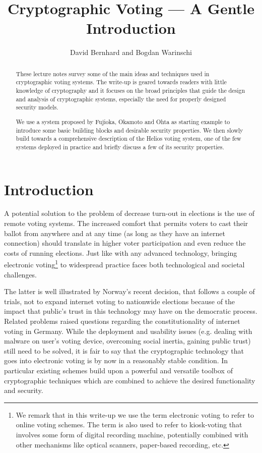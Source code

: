 \documentclass[envcountsame]{llncs}
\title{Cryptographic Voting --- A Gentle Introduction}
\author{David Bernhard and Bogdan Warinschi}
\institute{University of Bristol, England}
\begin{document}
\maketitle

\begin{abstract}
These lecture notes survey some of the main ideas and techniques used in cryptographic voting systems. 
The write-up is geared towards readers with little knowledge of cryptography and it focuses on the broad principles that guide the design and analysis of cryptographic systems, especially the need for properly designed security models.

We use a system proposed by Fujioka, Okamoto and Ohta as starting example to introduce some basic building blocks and desirable security properties.  We then slowly build towards a comprehensive description of the Helios voting system, one of the few systems deployed in practice and briefly discuss a few of its security properties. 
\end{abstract}

\section{Introduction}
A potential solution to the problem of decrease turn-out in elections is the use of remote voting systems.  The increased comfort that permits voters to cast their ballot from anywhere and at any time (as long as they have an internet connection) should translate in higher voter participation and even reduce the costs of running elections.  
Just like with any advanced technology, bringing electronic voting\footnote{We remark that in this write-up we use the term electronic voting to refer to online voting schemes. The term is also used to refer to kiosk-voting that involves some form of digital recording machine, potentially combined with other mechanisms like optical scanners, paper-based recording, etc. } to widespread practice faces both technological and societal challenges. 

The latter is well illustrated by Norway's recent decision, that follows a couple of trials, not to expand internet voting to nationwide elections because of the impact that public's trust in this technology may have on the democratic process.  Related problems raised questions regarding the constitutionality of internet voting in Germany.   
While the deployment and usability issues (e.g. dealing with malware on user's voting device, overcoming social inertia, gaining public trust) still need to be solved, it is fair to say that the cryptographic technology that goes into electronic voting is by now in a reasonably stable condition. In particular existing schemes build upon a powerful and versatile toolbox of cryptographic techniques which are combined to achieve the desired functionality and security.
\end{document}
